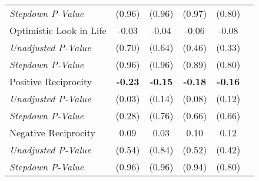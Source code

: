 \begin{tabular}{l c c c c c}
\quad \textit{Stepdown P-Value} & (0.96) & (0.96) & (0.97) & (0.80) \\
Optimistic Look in Life & -0.03 & -0.04 & -0.06 & -0.08 \\
\quad \textit{Unadjusted P-Value} & (0.70) & (0.64) & (0.46) & (0.33) \\
\quad \textit{Stepdown P-Value} & (0.96) & (0.96) & (0.89) & (0.80) \\
Positive Reciprocity & \textbf{ -0.23 } & \textbf{ -0.15 } & \textbf{ -0.18 } & \textbf{ -0.16 } \\
\quad \textit{Unadjusted P-Value} & (0.03) & (0.14) & (0.08) & (0.12) \\
\quad \textit{Stepdown P-Value} & (0.28) & (0.76) & (0.66) & (0.66) \\
Negative Reciprocity & 0.09 & 0.03 & 0.10 & 0.12 \\
\quad \textit{Unadjusted P-Value} & (0.54) & (0.84) & (0.52) & (0.42) \\
\quad \textit{Stepdown P-Value} & (0.96) & (0.96) & (0.94) & (0.80) \\
\bottomrule
\end{tabular}
